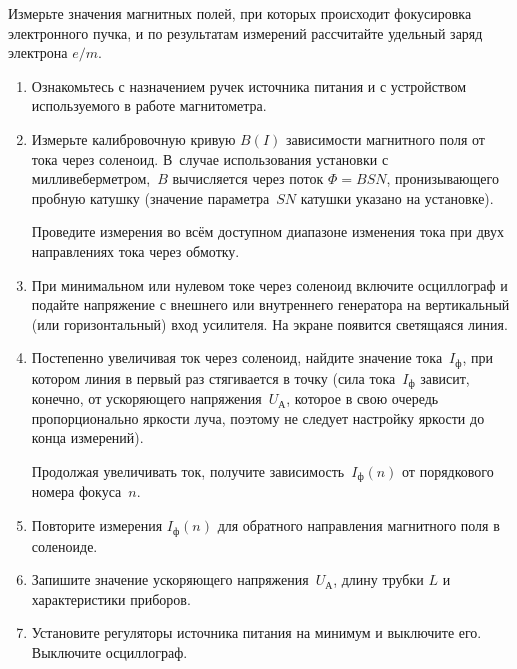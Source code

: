 \begin{lab:task}

Измерьте значения магнитных полей, при которых происходит фокусировка 
электронного пучка, и по результатам измерений рассчитайте удельный
заряд электрона $e/m$.

\begin{enumerate}
    
\item Ознакомьтесь с назначением ручек источника питания и с устройством 
    используемого в работе магнитометра. 
    
\item Измерьте калибровочную кривую $B(I)$ зависимости магнитного поля
от тока через соленоид. В~случае использования установки с
милливеберметром,~$B$ вычисляется через поток $\Phi=BSN$, пронизывающего пробную
катушку (значение параметра~$SN$ катушки указано на установке).

Проведите измерения во всём доступном диапазоне изменения тока при двух
направлениях тока через обмотку.

\item При минимальном или нулевом токе через соленоид включите осциллограф и
подайте напряжение с внешнего или внутреннего генератора на вертикальный (или
горизонтальный) вход усилителя. На экране появится светящаяся линия.

\item Постепенно увеличивая ток через соленоид, найдите значение тока~$I_ф$, при
котором линия в первый раз стягивается в точку (сила тока~$I_ф$ зависит,
конечно, от ускоряющего напряжения~$U_А$, которое в свою очередь пропорционально 
яркости луча, поэтому не следует настройку яркости до конца измерений).

Продолжая увеличивать ток, получите зависимость~$I_ф(n)$ от порядкового номера
фокуса~$n$.

\item Повторите измерения $I_ф(n)$ для обратного направления магнитного поля
в соленоиде.

\item Запишите значение ускоряющего напряжения~$U_А$, длину трубки
$L$ и характеристики приборов.

\item Установите регуляторы источника питания на минимум и выключите его. 
Выключите осциллограф.

\end{enumerate}



\end{lab:task}
